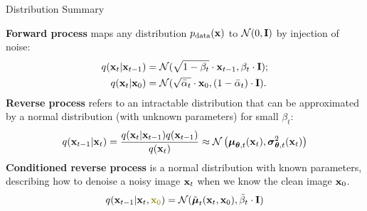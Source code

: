 \documentclass{beamer}
\begin{document}
\begin{frame}{Distribution Summary}

    \textbf{Forward process} maps any distribution $p_{\text{data}}(\mathbf{x})$ to $\mathcal{N}(0, \mathbf{I})$ by injection of noise:
    \begin{align*}
        q(\mathbf{x}_t | \mathbf{x}_{t-1}) &= \mathcal{N}(\sqrt{1 - \beta_t} \cdot \mathbf{x}_{t-1}, \beta_t \cdot \mathbf{I}); \\
        q(\mathbf{x}_t | \mathbf{x}_0) &= \mathcal{N}(\sqrt{\bar{\alpha}_t} \cdot \mathbf{x}_0, (1 - \bar{\alpha}_t) \cdot \mathbf{I}).
    \end{align*}
    \eqpause
    \textbf{Reverse process} refers to an intractable distribution that can be approximated by a normal distribution (with unknown parameters) for small $\beta_t$:
    \[
        q(\mathbf{x}_{t-1}|\mathbf{x}_{t}) = \frac{q(\mathbf{x}_{t}|\mathbf{x}_{t-1}) q(\mathbf{x}_{t-1})}{q(\mathbf{x}_{t})} \approx \mathcal{N} \left(\boldsymbol{\mu}_{\boldsymbol{\theta}, t}(\mathbf{x}_t), \boldsymbol{\sigma}_{\boldsymbol{\theta}, t}^2(\mathbf{x}_t)\right)
    \]
    \eqpause
    \textbf{Conditioned reverse process} is a normal distribution with known parameters, describing how to denoise a noisy image $\mathbf{x}_t$ when we know the clean image $\mathbf{x}_0$.
    \[
        q(\bx_{t-1}|\bx_{t}, {\color{olive}\bx_0}) = \cN(\tilde{\bmu}_t(\bx_t, \bx_0), \tilde{\beta}_t \cdot \bI)
    \]
\end{frame}
\end{document}
